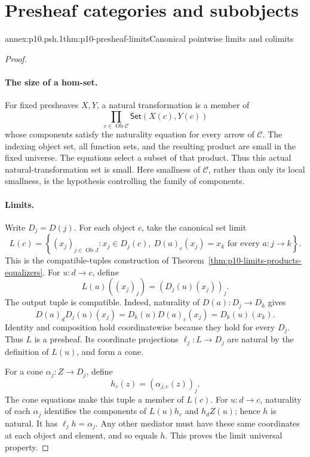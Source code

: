 
\section{Presheaf categories and subobjects}

\begin{annexitem}{annex:p10.psh.1}{thm:p10-presheaf-limits}{Canonical pointwise limits and colimits}
\begin{proof}
\paragraph{The size of a hom-set.}
For fixed presheaves \(X,Y\), a natural transformation is a
member of
\[
                 \prod_{c\in\operatorname{Ob}\mathcal C}
                               \mathsf{Set}(X(c),Y(c))
\]
whose components satisfy the naturality equation for every
arrow of \(\mathcal C\).
The indexing object set, all function sets, and the resulting
product are small in the fixed universe.
The equations select a subset of that product.
Thus this actual natural-transformation set is small.
Here smallness of \(\mathcal C\), rather than only its local
smallness, is the hypothesis controlling the family of components.

\paragraph{Limits.}
Write \(D_j=D(j)\).
For each object \(c\), take the canonical set limit
\[
 L(c)=
 \left\{(x_j)_{j\in\operatorname{Ob}J}:
   x_j\in D_j(c),\
   D(a)_c(x_j)=x_k\text{ for every }a:j\to k\right\}.
\]
This is the compatible-tuples construction of
Theorem~\ref{thm:p10-limits-products-equalizers}.
For \(u:d\to c\), define
\[
                         L(u)((x_j)_j)=(D_j(u)(x_j))_j.
\]
The output tuple is compatible.  Indeed, naturality of
\(D(a):D_j\to D_k\) gives
\[
 D(a)_d D_j(u)(x_j)
        =D_k(u)D(a)_c(x_j)=D_k(u)(x_k).
\]
Identity and composition hold coordinatewise because they
hold for every \(D_j\).
Thus \(L\) is a presheaf.
Its coordinate projections \(\ell_j:L\to D_j\) are natural
by the definition of \(L(u)\), and form a cone.

For a cone \(\alpha_j:Z\to D_j\), define
\[
                       h_c(z)=(\alpha_{j,c}(z))_j.
\]
The cone equations make this tuple a member of \(L(c)\).
For \(u:d\to c\), naturality of each \(\alpha_j\) identifies
the components of \(L(u)h_c\) and \(h_d Z(u)\);
hence \(h\) is natural.
It has \(\ell_j h=\alpha_j\).
Any other mediator must have these same coordinates at
each object and element, and so equals \(h\).
This proves the limit universal property.


\end{proof}
\end{annexitem}
